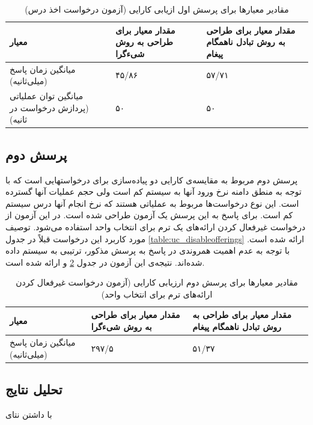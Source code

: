 
\begin{table}[ht]
\small
\begin{center}
\begin{tabular}{|p{7cm}|p{4cm}|p{4cm}|}
	\hline
\textbf{معیار} & \textbf{مقدار معیار برای طراحی به روش شیءگرا} & \textbf{مقدار معیار برای طراحی به روش تبادل ناهمگام پیغام} 
\\ 
	\hline
	میانگین زمان پاسخ (میلی‌ثانیه)
	 &
	 ۴۵/۸۶
	 &
     ۵۷/۷۱ 
\\
	\hline
	میانگین توان عملیاتی (پردازش درخواست در ثانیه)
	 &
	 ۵۰
	 &
	 ۵۰
\\
	\hline
\end{tabular}
\caption{\label{table:perf_result_1_2} مقادیر معیارها برای پرسش اول ازیابی کارایی (آزمون درخواست اخذ درس)}
\end{center}
\end{table}





\subsection{پرسش دوم}
پرسش دوم مربوط به مقایسه‌ی کارایی دو پیاده‌سازی برای درخواستهایی است که با توجه به منطق دامنه نرخ ورود آنها به سیستم کم است ولی حجم عملیات آنها گسترده است. این نوع درخواست‌ها مربوط به عملیاتی هستند که نرخ انجام آنها درس سیستم کم است. برای پاسخ به این پرسش یک آزمون طراحی شده است. در این آزمون از درخواست غیرفعال کردن ارائه‌های یک ترم برای انتخاب واحد استفاده می‌شود. توصیف مورد کاربرد این درخواست قبلاً در جدول \ref{table:uc_disableofferings} ارائه شده است. با توجه به عدم اهمیت همروندی در پاسخ به پرسش مذکور، ترتیبی به سیستم داده شده‌اند. نتیجه‌ی این آزمون در جدول \ref{table:perf_result_2} و ارائه شده است. 





\begin{table}[ht]
\small
\begin{center}
\begin{tabular}{|p{7cm}|p{4cm}|p{4cm}|}
	\hline
\textbf{معیار} & \textbf{مقدار معیار برای طراحی به روش شیءگرا} & \textbf{مقدار معیار برای طراحی به روش تبادل ناهمگام پیغام} 
\\ 
	\hline
	میانگین زمان پاسخ (میلی‌ثانیه)
	 &
	 ۲۹۷/۵
	 &
 ۵۱/۳۷ 
\\
	\hline
\end{tabular}
\caption{\label{table:perf_result_2} مقادیر معیارها برای پرسش دوم ارزیابی کارایی (آزمون درخواست غیرفعال کردن ارائه‌های ترم برای انتخاب واحد)}
\end{center}
\end{table}



















\subsection{تحلیل نتایج}
با داشتن نتای